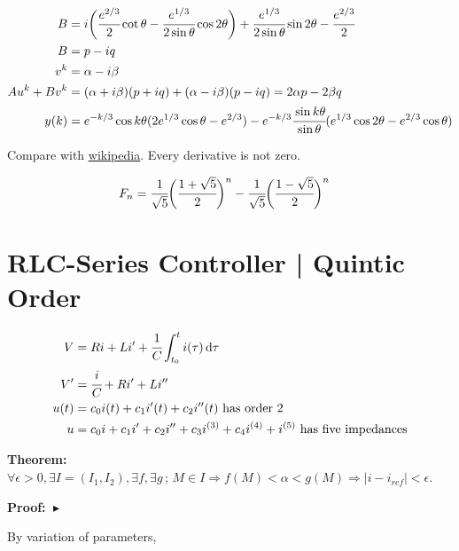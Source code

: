 \documentclass[11pt]{article}
\begin{document}
\begin{align}
B &= i \bigg( \cfrac{e^{2/3}}{2} \cot \theta - \cfrac{e^{1/3}}{2 \sin \theta} \cos 2\theta \bigg) + \cfrac{e^{1/3}}{2 \sin \theta} \sin 2\theta  - \cfrac{e^{2/3}}{2} \\
  B &= p - iq \\
  v^k &= \alpha - i \beta \\
  Au^k + Bv^k &= (\alpha + i \beta)(p + iq) + (\alpha - i \beta)(p - iq) =2 \alpha p - 2 \beta q \\
  y(k) &= e^{-k/3} \cos k\theta ( 2e^{1/3} \cos \theta - e^{2/3} ) - e^{-k/3} \cfrac{\sin k\theta}{\sin \theta} (  e^{1/3} \cos 2\theta - e^{2/3} \cos \theta )
\end{align}

Compare with \href{https://wikimedia.org/api/rest\_v1/media/math/render/svg/bf676e167e853211636ae5862890a08ae78cb10a}{\underline{wikipedia}}. Every derivative is not zero.

		\begin{align}
F_n &= \cfrac{1}{\sqrt 5} \bigg( \cfrac{1 + \sqrt 5}{2} \bigg)^n - \cfrac{1}{\sqrt 5} \bigg( \cfrac{1 - \sqrt 5}{2} \bigg)^n
		\end{align}

\section{RLC-Series Controller | Quintic Order}

\begin{align}
V &= Ri + L i' + \cfrac{1}{C} \int_{t_0}^t i(\tau)\,\mathrm{d}\tau \\
V' &= \cfrac{i}{C} + Ri' + L i''  \\
u(t) &= c_0 i(t) + c_1 i'(t) + c_2 i''(t) \text{ has order 2} \\
u &= c_0 i + c_1 i' + c_2 i'' + c_3 i^{(3)} + c_4 i^{(4)} + i^{(5)} \text{ has five impedances}
\end{align}

\textbf{Theorem:} $\forall \epsilon > 0, \exists I = (I_1, I_2), \exists f, \exists g\,;\,M \in I \Rightarrow f(M) < \alpha < g(M) \Rightarrow |i - i_{ref}| < \epsilon$.

\textbf{Proof:}$\,\,\blacktriangleright$

By variation of parameters,
\end{document}
